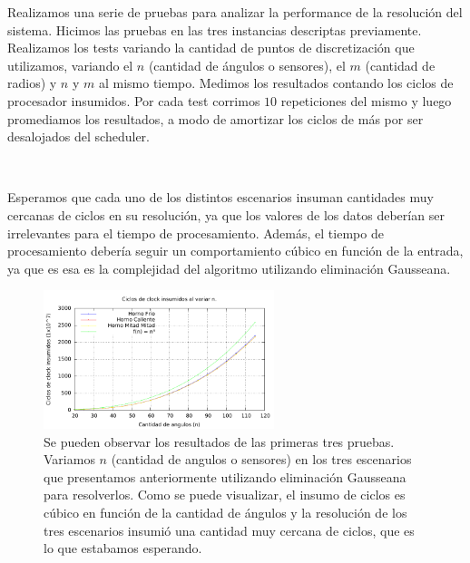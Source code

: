 Realizamos una serie de pruebas para analizar la performance de la resolución del sistema. Hicimos las pruebas en las tres instancias descriptas previamente. Realizamos los tests variando la cantidad de puntos de discretizaci\'on que utilizamos, variando el $n$ (cantidad de \'angulos o sensores), el $m$ (cantidad de radios) y $n$ y $m$ al mismo tiempo. Medimos los resultados contando los ciclos de procesador insumidos. Por cada test corrimos $10$ repeticiones del mismo y luego promediamos los resultados, a modo de amortizar los ciclos de más por ser desalojados del scheduler. 

~

Esperamos que cada uno de los distintos escenarios insuman cantidades muy cercanas de ciclos en su resolución, ya que los valores de los datos deber\'ian ser irrelevantes para el tiempo de procesamiento. Adem\'as, el tiempo de procesamiento deber\'ia seguir un comportamiento cúbico en función de la entrada, ya que es esa es la complejidad del algoritmo utilizando eliminaci\'on Gausseana.

\begin{figure}
  \caption{ Se pueden observar los resultados de las primeras tres pruebas. Variamos $n$ (cantidad de angulos o sensores) en los tres escenarios que presentamos anteriormente utilizando eliminación Gausseana para resolverlos. Como se puede visualizar, el insumo de ciclos es cúbico en función de la cantidad de ángulos y la resolución de los tres escenarios insumió una cantidad muy cercana de ciclos, que es lo que estabamos esperando. \newline \newline}
  \includegraphics[width=0.6\textwidth]{../src/experimentacion/PDFs/sensores.pdf}
\end{figure}

